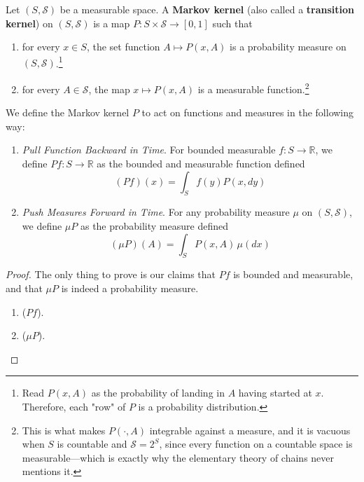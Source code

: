 	\begin{definition}
		\label{def:markov-kernel}
		Let $(S, \mathcal{S})$ be a measurable space. A \textbf{Markov kernel} (also called a \textbf{transition kernel}) on $(S, \mathcal{S})$ is a map $P: S \times \mathcal{S} \rightarrow [0, 1]$ such that

		\begin{enumerate}
			\item for every $x \in S$, the set function $A \mapsto P(x, A)$ is a probability measure on $(S, \mathcal{S})$.\footnote{Read $P(x, A)$ as the probability of landing in $A$ having started at $x$. Therefore, each "row" of $P$ is a probability distribution. }

			\item for every $A \in \mathcal{S}$, the map $x \mapsto P(x, A)$ is a measurable function.\footnote{This is what makes $P(\cdot, A)$ integrable against a measure, and it is vacuous when $S$ is countable and $\mathcal{S} = 2^S$, since every function on a countable space is measurable---which is exactly why the elementary theory of chains never mentions it. }
		\end{enumerate}

		We define the Markov kernel $P$ to act on functions and measures in the following way: 
		\begin{enumerate}
			\item \textit{Pull Function Backward in Time}. For bounded measurable $f: S \to \mathbb{R}$, we define $Pf: S \to \mathbb{R}$ as the bounded and measurable function defined
				\begin{equation}
					(Pf)(x) = \int_S f(y) P(x, dy)
				\end{equation}

			\item \textit{Push Measures Forward in Time}. For any probability measure $\mu$ on $(S, \mathcal{S})$, we define $\mu P$ as the probability measure defined
				\begin{equation}
					(\mu P)(A) = \int_S P(x, A) \,\mu(dx)
				\end{equation}
		\end{enumerate}
	\end{definition}
	\begin{proof}
	  The only thing to prove is our claims that $Pf$ is bounded and measurable, and that $\mu P$ is indeed a probability measure. 
		\begin{enumerate}
		  \item ($Pf$). 
			\item ($\mu P$). 
		\end{enumerate}
	\end{proof}

